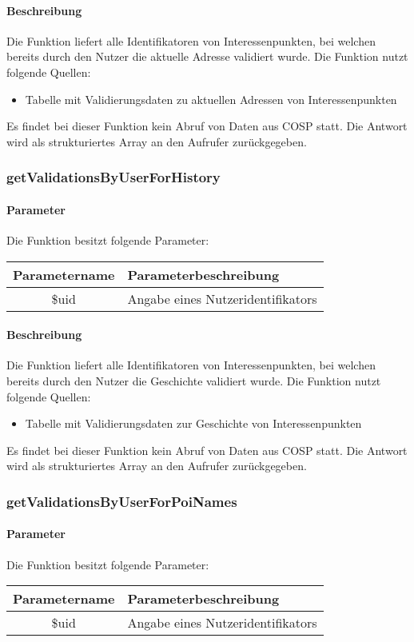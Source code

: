 \paragraph{Beschreibung} Die Funktion liefert alle Identifikatoren von Interessenpunkten, bei welchen bereits durch den Nutzer die aktuelle Adresse validiert wurde. Die Funktion nutzt folgende Quellen:
\begin{itemize}
	\item Tabelle mit Validierungsdaten zu aktuellen Adressen von Interessenpunkten
\end{itemize}
Es findet bei dieser Funktion kein Abruf von Daten aus {\glqq COSP\grqq} statt. Die Antwort wird als strukturiertes Array an den Aufrufer zurückgegeben.
\subsubsection{getValidationsByUserForHistory}
\paragraph{Parameter} Die Funktion besitzt folgende Parameter:
\begin{table}[H]
	\begin{tabular}{|c|p{11cm}|}
		\hline
		\textbf{Parametername} & \textbf{Parameterbeschreibung} \\ \hline
		\$uid & Angabe eines Nutzeridentifikators \\ \hline
	\end{tabular}
\end{table}
\paragraph{Beschreibung} Die Funktion liefert alle Identifikatoren von Interessenpunkten, bei welchen bereits durch den Nutzer die Geschichte validiert wurde. Die Funktion nutzt folgende Quellen:
\begin{itemize}
	\item Tabelle mit Validierungsdaten zur Geschichte von Interessenpunkten
\end{itemize}
Es findet bei dieser Funktion kein Abruf von Daten aus {\glqq COSP\grqq} statt. Die Antwort wird als strukturiertes Array an den Aufrufer zurückgegeben.
\subsubsection{getValidationsByUserForPoiNames}
\paragraph{Parameter} Die Funktion besitzt folgende Parameter:
\begin{table}[H]
	\begin{tabular}{|c|p{11cm}|}
		\hline
		\textbf{Parametername} & \textbf{Parameterbeschreibung} \\ \hline
		\$uid & Angabe eines Nutzeridentifikators \\ \hline
	\end{tabular}
\end{table}
